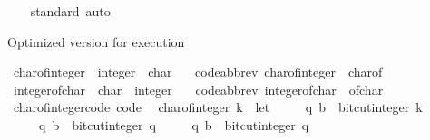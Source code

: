 \begin{isabellebody}
%
\isadelimproof
\ \ %
\endisadelimproof
%
\isatagproof
{}\isamarkupfalse%
\ standard\ auto%
\endisatagproof
{\isafoldproof}%
%
\isadelimproof
%
\endisadelimproof
%
\begin{isamarkuptext}%
Optimized version for execution%
\end{isamarkuptext}\isamarkuptrue%
\isamarkupfalse%
\ char{\isacharunderscore}{\kern0pt}of{\isacharunderscore}{\kern0pt}integer\ {\isacharcolon}{\kern0pt}{\isacharcolon}{\kern0pt}\ {\isachardoublequoteopen}integer\ {\isasymRightarrow}\ char{\isachardoublequoteclose}\isanewline
\ \ \ {\isacharbrackleft}{\kern0pt}code{\isacharunderscore}{\kern0pt}abbrev{\isacharbrackright}{\kern0pt}{\isacharcolon}{\kern0pt}\ {\isachardoublequoteopen}char{\isacharunderscore}{\kern0pt}of{\isacharunderscore}{\kern0pt}integer\ {\isacharequal}{\kern0pt}\ char{\isacharunderscore}{\kern0pt}of{\isachardoublequoteclose}\isanewline
\isanewline
{}\isamarkupfalse%
\ integer{\isacharunderscore}{\kern0pt}of{\isacharunderscore}{\kern0pt}char\ {\isacharcolon}{\kern0pt}{\isacharcolon}{\kern0pt}\ {\isachardoublequoteopen}char\ {\isasymRightarrow}\ integer{\isachardoublequoteclose}\isanewline
\ \ \ {\isacharbrackleft}{\kern0pt}code{\isacharunderscore}{\kern0pt}abbrev{\isacharbrackright}{\kern0pt}{\isacharcolon}{\kern0pt}\ {\isachardoublequoteopen}integer{\isacharunderscore}{\kern0pt}of{\isacharunderscore}{\kern0pt}char\ {\isacharequal}{\kern0pt}\ of{\isacharunderscore}{\kern0pt}char{\isachardoublequoteclose}\isanewline
\isanewline
{}\isamarkupfalse%
\ char{\isacharunderscore}{\kern0pt}of{\isacharunderscore}{\kern0pt}integer{\isacharunderscore}{\kern0pt}code\ {\isacharbrackleft}{\kern0pt}code{\isacharbrackright}{\kern0pt}{\isacharcolon}{\kern0pt}\isanewline
\ \ {\isachardoublequoteopen}char{\isacharunderscore}{\kern0pt}of{\isacharunderscore}{\kern0pt}integer\ k\ {\isacharequal}{\kern0pt}\ {\isacharparenleft}{\kern0pt}let\isanewline
\ \ \ \ \ {\isacharparenleft}{\kern0pt}q{}{\isacharcomma}{\kern0pt}\ b{}{\isacharparenright}{\kern0pt}\ {\isacharequal}{\kern0pt}\ bit{\isacharunderscore}{\kern0pt}cut{\isacharunderscore}{\kern0pt}integer\ k{\isacharsemicolon}{\kern0pt}\isanewline
\ \ \ \ \ {\isacharparenleft}{\kern0pt}q{}{\isacharcomma}{\kern0pt}\ b{}{\isacharparenright}{\kern0pt}\ {\isacharequal}{\kern0pt}\ bit{\isacharunderscore}{\kern0pt}cut{\isacharunderscore}{\kern0pt}integer\ q{}{\isacharsemicolon}{\kern0pt}\isanewline
\ \ \ \ \ {\isacharparenleft}{\kern0pt}q{}{\isacharcomma}{\kern0pt}\ b{}{\isacharparenright}{\kern0pt}\ {\isacharequal}{\kern0pt}\ bit{\isacharunderscore}{\kern0pt}cut{\isacharunderscore}{\kern0pt}integer\ q{}{\isacharsemicolon}{\kern0pt}\isanewline

\end{isabellebody}
